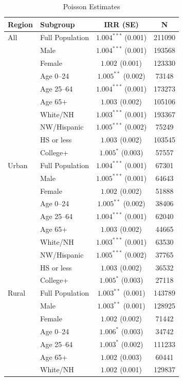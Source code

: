 \documentclass[12pt, a4paper]{article}
\begin{document}
\begin{table}[H]
\centering
\caption{Poisson Estimates}
\label{tab:poisson_reg_summary}
\begin{tabular}{llcc}
\toprule
\textbf{Region} & \textbf{Subgroup} & \textbf{IRR (SE)} & \textbf{N} \\
\midrule
All & Full Population & $1.004^{***}$ (0.001) & 211090 \\
 & Male & $1.004^{***}$ (0.001) & 193568 \\
 & Female & $1.002^{}$ (0.001) & 123330 \\
 & Age 0–24 & $1.005^{**}$ (0.002) & 73148 \\
 & Age 25–64 & $1.004^{***}$ (0.001) & 173273 \\
 & Age 65+ & $1.003^{}$ (0.002) & 105106 \\
 & White/NH & $1.003^{***}$ (0.001) & 193367 \\
 & NW/Hispanic & $1.005^{***}$ (0.002) & 75249 \\
 & HS or less & $1.003^{}$ (0.002) & 103545 \\
 & College+ & $1.005^{*}$ (0.003) & 57557 \\
 Urban & Full Population & $1.004^{***}$ (0.001) & 67301 \\
 & Male & $1.005^{***}$ (0.001) & 64643 \\
 & Female & $1.002^{}$ (0.002) & 51888 \\
 & Age 0–24 & $1.005^{**}$ (0.002) & 38406 \\
 & Age 25–64 & $1.004^{***}$ (0.001) & 62040 \\
 & Age 65+ & $1.003^{}$ (0.002) & 44665 \\
 & White/NH & $1.003^{***}$ (0.001) & 63530 \\
 & NW/Hispanic & $1.005^{***}$ (0.002) & 37765 \\
 & HS or less & $1.003^{}$ (0.002) & 36532 \\
 & College+ & $1.005^{*}$ (0.003) & 27118 \\
Rural & Full Population & $1.003^{**}$ (0.001) & 143789 \\
 & Male & $1.003^{**}$ (0.001) & 128925 \\
 & Female & $1.002^{}$ (0.002) & 71442 \\
 & Age 0–24 & $1.006^{*}$ (0.003) & 34742 \\
 & Age 25–64 & $1.003^{*}$ (0.002) & 111233 \\
 & Age 65+ & $1.002^{}$ (0.003) & 60441 \\
 & White/NH & $1.002^{}$ (0.001) & 129837 \\

\end{tabular}
\end{table}
\end{document}
